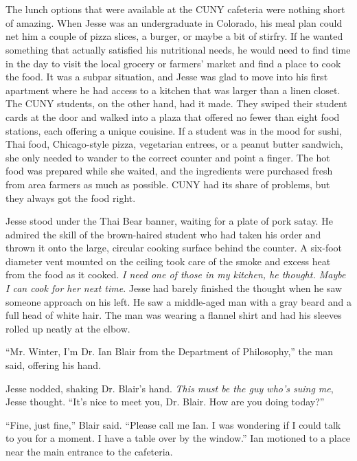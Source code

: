 \documentclass[12pt]{book}
\begin{document}
\chapter{}

The lunch options that were available at the CUNY cafeteria were nothing short of amazing.  When Jesse was an undergraduate in Colorado, his meal plan could net him a couple of pizza slices, a burger, or maybe a bit of stirfry.  If he wanted something that actually satisfied his nutritional needs, he would need to find time in the day to visit the local grocery or farmers' market and find a place to cook the food.  It was a subpar situation, and Jesse was glad to move into his first apartment where he had access to a kitchen that was larger than a linen closet.  The CUNY students, on the other hand, had it made.  They swiped their student cards at the door and walked into a plaza that offered no fewer than eight food stations, each offering a unique couisine.  If a student was in the mood for sushi, Thai food, Chicago-style pizza, vegetarian entrees, or a peanut butter sandwich, she only needed to wander to the correct counter and point a finger.  The hot food was prepared while she waited, and the ingredients were purchased fresh from area farmers as much as possible.  CUNY had its share of problems, but they always got the food right.

Jesse stood under the Thai Bear banner, waiting for a plate of pork satay.  He admired the skill of the brown-haired student who had taken his order and thrown it onto the large, circular cooking surface behind the counter.  A six-foot diameter vent mounted on the ceiling took care of the smoke and excess heat from the food as it cooked.  \emph{I need one of those in my kitchen\emph{, he thought.  }Maybe I can cook for her next time}.  Jesse had barely finished the thought when he saw someone approach on his left.  He saw a middle-aged man with a gray beard and a full head of white hair.  The man was wearing a flannel shirt and had his sleeves rolled up neatly at the elbow.

``Mr. Winter, I'm Dr. Ian Blair from the Department of Philosophy,'' the man said, offering his hand.

Jesse nodded, shaking Dr. Blair's hand.  \emph{This must be the guy who's suing me}, Jesse thought.  ``It's nice to meet you, Dr. Blair.  How are you doing today?''

``Fine, just fine,'' Blair said. ``Please call me Ian.  I was wondering if I could talk to you for a moment.  I have a table over by the window.''  Ian motioned to a place near the main entrance to the cafeteria.
\end{document}

